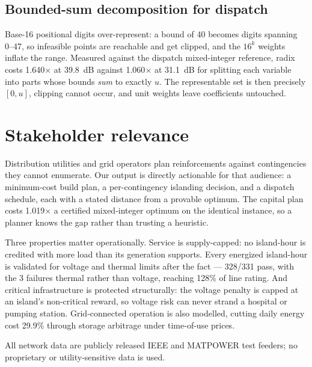 \documentclass[11pt,twocolumn]{article}
\begin{document}
\subsection{Bounded-sum decomposition for dispatch}
Base-16 positional digits over-represent: a bound of 40 becomes digits spanning 0--47, so infeasible points are reachable and get clipped, and the $16^k$ weights inflate the range. Measured against the dispatch mixed-integer reference, radix costs 1.640$\times$ at 39.8~dB against 1.060$\times$ at 31.1~dB for splitting each variable into parts whose bounds {\em sum} to exactly $u$. The representable set is then precisely $[0,u]$, clipping cannot occur, and unit weights leave coefficients untouched.

\section{Stakeholder relevance}
Distribution utilities and grid operators plan reinforcements against contingencies they cannot enumerate. Our output is directly actionable for that audience: a minimum-cost build plan, a per-contingency islanding decision, and a dispatch schedule, each with a stated distance from a provable optimum. The capital plan costs 1.019$\times$ a certified mixed-integer optimum on the identical instance, so a planner knows the gap rather than trusting a heuristic.

Three properties matter operationally. Service is supply-capped: no island-hour is credited with more load than its generation supports. Every energized island-hour is validated for voltage and thermal limits after the fact --- 328/331 pass, with the 3 failures thermal rather than voltage, reaching 128\% of line rating. And critical infrastructure is protected structurally: the voltage penalty is capped at an island's non-critical reward, so voltage risk can never strand a hospital or pumping station. Grid-connected operation is also modelled, cutting daily energy cost 29.9\% through storage arbitrage under time-of-use prices.

All network data are publicly released IEEE and MATPOWER test feeders; no proprietary or utility-sensitive data is used.
\end{document}
